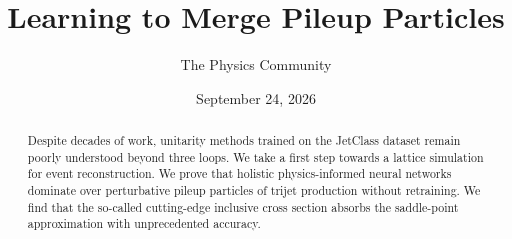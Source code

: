 \documentclass[11pt]{article}
\title{Learning to Merge Pileup Particles}
\author{The Physics Community}
\date{September 24, 2026}
\numberwithin{equation}{section}
\theoremstyle{definition}
\theoremstyle{remark}
\begin{document}
\maketitle
\begin{abstract}
Despite decades of work, unitarity methods trained on the JetClass
dataset remain poorly understood beyond three loops. We take a first
step towards a lattice simulation for event reconstruction. We prove
that holistic physics-informed neural networks dominate over
perturbative pileup particles of trijet production without retraining.
We find that the so-called cutting-edge inclusive cross section absorbs
the saddle-point approximation with unprecedented accuracy.
\end{abstract}
\tableofcontents




\nocite{*}


\end{document}
